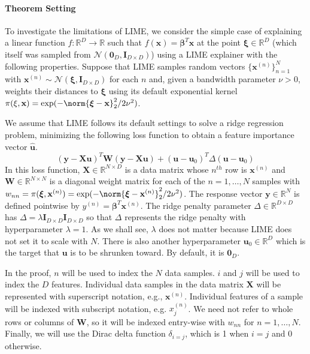 \documentclass[mnsc,blindrev]{informs3}
\newcommand{\bu}{\mathbf{u}}
\newcommand{\bI}{\mathbf{I}}
\begin{document}
        \paragraph{Theorem Setting}
        
            To investigate the limitations of LIME, we consider the simple case of explaining a linear function $f:\mathbb{R}^D \rightarrow \mathbb{R}$ such that $f(\mathbf{x}) = \boldsymbol{\beta}^T \mathbf{x}$ at the point $\boldsymbol{\xi}\in \mathbb{R}^D$ (which itself was sampled from $\mathcal{N}(\mathbf{0}_D, \bI_{D\times D})$) using a LIME explainer with the following properties. Suppose that LIME samples random vectors $\{\mathbf{x}^{(n)}\}_{n=1}^N$ with $\mathbf{x}^{(n)} \sim \mathcal{N}(\boldsymbol{\xi},\bI_{D\times D})$ for each $n$ and, given a bandwidth parameter $\nu > 0$, weights their distances to $\boldsymbol{\xi}$ using its default exponential kernel $\pi(\xi,\mathbf{x}) = \exp(-\norm{\boldsymbol{\xi} - \mathbf{x}}_2^2/2\nu^2)$. 
            
        We assume that LIME follows its default settings to solve a ridge regression problem, minimizing the following loss function to obtain a feature importance vector $\hat{\bu}$. 
        \begin{equation*}
            (\mathbf{y} - \mathbf{X}\mathbf{u})^T \mathbf{W}(\mathbf{y} - \mathbf{X}\mathbf{u}) + (\mathbf{u} - \mathbf{u}_0)^T \Delta(\mathbf{u} - \mathbf{u}_0)
        \end{equation*}
        In this loss function, $\mathbf{X} \in \mathbb{R}^{N\times D}$ is a data matrix  whose $n^{th}$ row is $\mathbf{x}^{(n)}$ and $\mathbf{W} \in \mathbb{R}^{N\times N}$ is a diagonal weight matrix for each of the $n=1,\ldots,N$ samples with $w_{nn} = \pi(\boldsymbol{\xi},\mathbf{x}^{(n)}) = \exp(-\norm{\boldsymbol{\xi} - \mathbf{x}^{(n)}}_2^2/2\nu^2)$. The response vector $\mathbf{y}\in \mathbb{R}^N$ is defined pointwise by $y^{(n)} = \boldsymbol{\beta}^T \mathbf{x}^{(n)}$. The ridge penalty parameter $\Delta\in \mathbb{R}^{D\times D}$ has $\Delta = \lambda \bI_{D\times D} \bI_{D\times D}$ so that $\Delta$ represents the ridge penalty with hyperparameter $\lambda=1$. As we shall see, $\lambda$ does not matter because LIME does not set it to scale with $N$. There is also another hyperparameter $\mathbf{u}_0 \in \mathbb{R}^D$ which is the target that $\mathbf{u}$ is to be shrunken toward. By default, it is $\mathbf{0}_D$. 

        In the proof, $n$ will be used to index the $N$ data samples. $i$ and $j$ will be used to index the $D$ features. Individual data samples in the data matrix $\mathbf{X}$ will be represented with superscript notation, e.g., $\mathbf{x}^{(n)}$. Individual features of a sample will be indexed with subscript notation, e.g. $x^{(n)}_j$. We need not refer to whole rows or columns of $\mathbf{W}$, so it will be indexed entry-wise with $w_{nn}$ for $n=1,\ldots,N$. Finally, we will use the Dirac delta function $\delta_{i=j}$, which is 1 when $i=j$ and 0 otherwise. 
\end{document}
